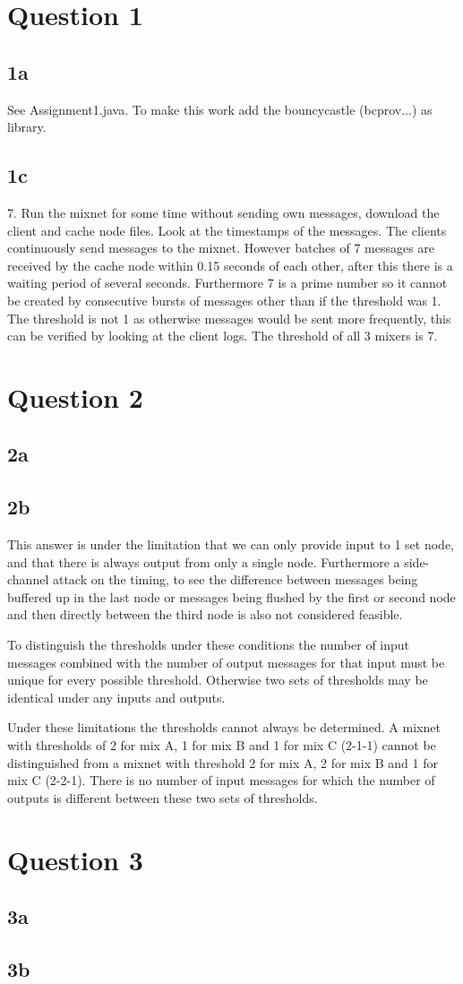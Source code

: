 \documentclass{article}
\begin{document}
\section*{Question 1}
\subsection*{1a}
 See Assignment1.java. To make this work add the bouncycastle (bcprov...) as library.
\subsection*{1c}
7. Run the mixnet for some time without sending own messages, download the client and cache node files. Look at the timestamps of the messages. The clients continuously send messages to the mixnet. However batches of 7 messages are received by the cache node within 0.15 seconds of each other, after this there is a waiting period of several seconds. Furthermore 7 is a prime number so it cannot be created by consecutive bursts of messages other than if the threshold was 1. The threshold is not 1 as otherwise messages would be sent more frequently, this can be verified by looking at the client logs. The threshold of all 3 mixers is 7.

\section*{Question 2}
\subsection*{2a}
\subsection*{2b}
This answer is under the limitation that we can only provide input to 1 set node, and that there is always output from only a single node. Furthermore a side-channel attack on the timing, to see the difference between messages being buffered up in the last node or messages being flushed by the first or second node and then directly between the third node is also not considered feasible.

To distinguish the thresholds under these conditions the number of input messages combined with the number of output messages for that input must be unique for every possible threshold. Otherwise two sets of thresholds may be identical under any inputs and outputs.

Under these limitations the thresholds cannot always be determined. A mixnet with thresholds of 2 for mix A, 1 for mix B and 1 for mix C (2-1-1) cannot be distinguished from a mixnet with threshold 2 for mix A, 2 for mix B and 1 for mix C (2-2-1). There is no number of input messages for which the number of outputs is different between these two sets of thresholds.

\section*{Question 3}
\subsection*{3a}
\subsection*{3b}
\end{document}
